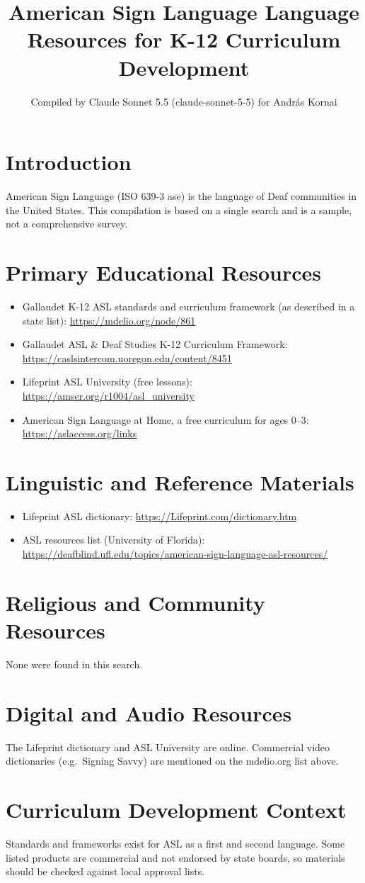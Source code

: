 \documentclass[12pt]{article}
\title{American Sign Language Language Resources for K-12 Curriculum Development}
\author{Compiled by Claude Sonnet 5.5 (claude-sonnet-5-5) for Andr\'as Kornai}
\date{}
\begin{document}
\maketitle
\section{Introduction}
American Sign Language (ISO 639-3 ase) is the language of Deaf communities in the United States. This compilation is based on a single search and is a sample, not a comprehensive survey.
\section{Primary Educational Resources}
\begin{itemize}
\item Gallaudet K-12 ASL standards and curriculum framework (as described in a state list): \url{https://mdelio.org/node/861}
\item Gallaudet ASL \& Deaf Studies K-12 Curriculum Framework: \url{https://caslsintercom.uoregon.edu/content/8451}
\item Lifeprint ASL University (free lessons): \url{https://amser.org/r1004/asl_university}
\item American Sign Language at Home, a free curriculum for ages 0--3: \url{https://aslaccess.org/links}
\end{itemize}
\section{Linguistic and Reference Materials}
\begin{itemize}
\item Lifeprint ASL dictionary: \url{https://Lifeprint.com/dictionary.htm}
\item ASL resources list (University of Florida): \url{https://deafblind.ufl.edu/topics/american-sign-language-asl-resources/}
\end{itemize}
\section{Religious and Community Resources}
None were found in this search.
\section{Digital and Audio Resources}
The Lifeprint dictionary and ASL University are online. Commercial video dictionaries (e.g.\ Signing Savvy) are mentioned on the mdelio.org list above.
\section{Curriculum Development Context}
Standards and frameworks exist for ASL as a first and second language. Some listed products are commercial and not endorsed by state boards, so materials should be checked against local approval lists.
\end{document}

